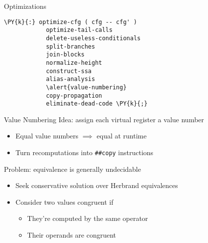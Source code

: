 \documentclass{beamer}
\begin{document}
\begin{frame}[fragile]{Optimizations}
  \begin{center}
    \begin{minipage}{0.5\linewidth}
      \begin{Verbatim}[gobble=8,commandchars=\\\{\}]
        \PY{k}{:} optimize-cfg ( cfg -- cfg' )
            optimize-tail-calls
            delete-useless-conditionals
            split-branches
            join-blocks
            normalize-height
            construct-ssa
            alias-analysis
            \alert{value-numbering}
            copy-propagation
            eliminate-dead-code \PY{k}{;}
      \end{Verbatim}
    \end{minipage}
  \end{center}
\end{frame}


\begin{frame}{Value Numbering}
  Idea: assign each virtual register a \alert{value number}
  \begin{itemize}
    \item Equal value numbers $\implies$ equal at runtime
    \item Turn recomputations into \texttt{\#\#copy} instructions
  \end{itemize}

  Problem: equivalence is generally undecidable
  \begin{itemize}
    \item Seek \alert{conservative} solution over \alert{Herbrand equivalences}
    \item Consider two values \alert{congruent} if
    \begin{itemize}
      \item They're computed by the same operator
      \item Their operands are congruent
    \end{itemize}
  \end{itemize}
\end{frame}

\end{document}
